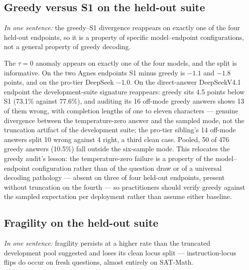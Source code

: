 \subsection{Greedy versus S1 on the held-out suite}
\label{sec:heldoutgreedy}

\emph{In one sentence:} the greedy--S1 divergence reappears on exactly one of the four held-out endpoints, so it is a property of specific model--endpoint configurations, not a general property of greedy decoding.

The $\tau=0$ anomaly appears on exactly one of the four models, and the split is informative. On the two Agnes endpoints S1 minus greedy is $-1.1$ and $-1.8$ points, and on the pro-tier DeepSeek $-1.0$. On the direct-answer DeepSeekV4.1 endpoint the development-suite signature reappears: greedy sits 4.5 points below S1 (73.1\% against 77.6\%), and auditing its 16 off-mode greedy answers shows 13 of them wrong, with completion lengths of one to eleven characters --- genuine divergence between the temperature-zero answer and the sampled mode, not the truncation artifact of the development suite; the pro-tier sibling's 14 off-mode answers split 10 wrong against 4 right, a third clean case. Pooled, 50 of 476 greedy answers (10.5\%) fall outside the six-sample mode. This relocates the greedy audit's lesson: the temperature-zero failure is a property of the model--endpoint configuration rather than of the question draw or of a universal decoding pathology --- absent on three of four held-out endpoints, present without truncation on the fourth --- so practitioners should verify greedy against the sampled expectation per deployment rather than assume either baseline.

\subsection{Fragility on the held-out suite}
\label{sec:heldoutfragility}

\emph{In one sentence:} fragility persists at a higher rate than the truncated development pool suggested and loses its clean locus split --- instruction-locus flips do occur on fresh questions, almost entirely on SAT-Math.

